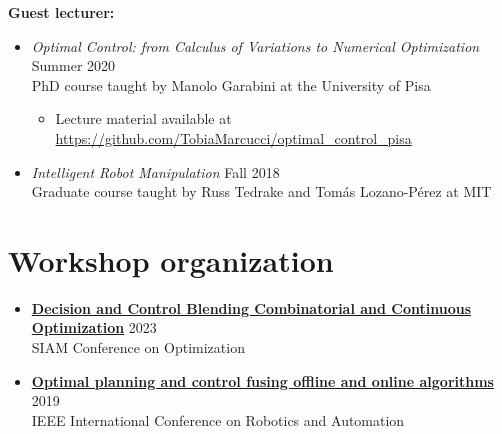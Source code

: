\documentclass[11pt,a4paper,sans]{moderncv}
\begin{document}
\vspace{5pt}

\textbf{Guest lecturer:}

\vspace{5pt}

\begin{itemize}

\item \textit{Optimal Control: from Calculus of Variations to Numerical Optimization} \hfill Summer 2020 \\
PhD course taught by Manolo Garabini at the University of Pisa
\begin{itemize}
\item
Lecture material available at \href{https://github.com/TobiaMarcucci/optimal_control_pisa}{\color{cyan}https://github.com/TobiaMarcucci/optimal\_control\_pisa}
\end{itemize}

\item \textit{Intelligent Robot Manipulation} \hfill Fall 2018 \\
Graduate course taught by Russ Tedrake and Tom\'{a}s Lozano-P\'{e}rez at MIT

\end{itemize}

%

\section{Workshop organization}

\vspace{5pt}

\begin{itemize}

\item\href{https://meetings.siam.org/sess/dsp_programsess.cfm?SESSIONCODE=76788}{\color{cyan}\textbf{Decision and Control Blending Combinatorial and Continuous Optimization}} \hfill 2023 \\
SIAM Conference on Optimization

\item\href{https://sites.google.com/mit.edu/icra19ws}{\color{cyan}\textbf{Optimal planning and control fusing offline and online algorithms}} \hfill 2019 \\
IEEE International Conference on Robotics and Automation

\end{itemize}
\end{document}
